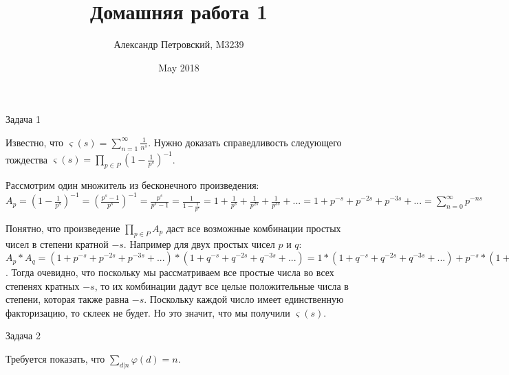 \documentclass{article}
\title{Домашняя работа 1}
\author{Александр Петровский, M3239}
\date{May 2018}
\begin{document}
\maketitle

\begin{center}
	Задача 1
\end{center}

Известно, что $\varsigma(s) = \sum\limits_{n=1}^{\infty}\frac{1}{n^{s}}$. Нужно доказать справедливость следующего тождества $\varsigma(s) = \prod\limits_{p \in P}(1 - \frac{1}{p^{s}})^{-1}$. 

Рассмотрим один множитель из бесконечного произведения: $A_{p} = (1 - \frac{1}{p^{s}})^{-1} = (\frac{p^{s} - 1}{p^{s}})^{-1} = \frac{p^{s}}{p^{s} - 1} = \frac{1}{1 - \frac{1}{p^{s}}} = 1 + \frac{1}{p^{s}} + \frac{1}{p^{2s}} + \frac{1}{p^{3s}} + ... = 1 + p^{-s} + p^{-2s} + p^{-3s} + ... = \sum\limits_{n=0}^{\infty}p^{-ns}$

Понятно, что произведение $\prod\limits_{p \in P}A_p$ даст все возможные комбинации простых чисел в степени кратной $-s$.  Например для двух простых чисел $p$ и $q$: $A_{p} * A_{q} = (1 + p^{-s} + p^{-2s} + p^{-3s} + ...) * (1 + q^{-s} + q^{-2s} + q^{-3s} + ...) = 1 * (1 + q^{-s} + q^{-2s} + q^{-3s} + ...) + p^{-s} * (1 + q^{-s} + q^{-2s} + q^{-3s} + ...) + ...$. Тогда очевидно, что поскольку мы рассматриваем все простые числа во всех степенях кратных $-s$, то их комбинации дадут все целые положительные числа в степени, которая также равна $-s$. Поскольку каждой число имеет единственную факторизацию, то склеек не будет. Но это значит, что мы получили  $\varsigma(s)$.

\begin{center}
	Задача 2
\end{center}

Требуется показать, что $\sum\limits_{d|n}\varphi(d) = n$.
\end{document}
